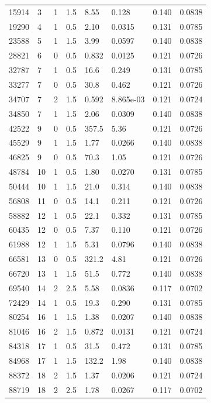 \documentclass[preview]{standalone}
\begin{document}
{{\begin{tabular}{L{1.2cm}C{1.2cm} C{0.3cm}C{0.5cm} C{1.4cm}C{1.4cm} C{1.4cm}C{1.4cm}}
  15914  &     3  & 1     & 1.5 &  8.55  & 0.128  & 0.140 &  0.0838   \\ 
  19290  &     4  & 1     & 0.5 &  2.10  & 0.0315  & 0.131 &  0.0785   \\ 
  23588  &     5  & 1     & 1.5 &  3.99  & 0.0597  & 0.140 &  0.0838   \\ 
  28821  &     6  & 0     & 0.5 &  0.832  & 0.0125  & 0.121 &  0.0726   \\ 
  32787  &     7  & 1     & 0.5 &  16.6  & 0.249  & 0.131 &  0.0785   \\ 
  33277  &     7  & 0     & 0.5 &  30.8  & 0.462  & 0.121 &  0.0726   \\ 
  34707  &     7  & 2     & 1.5 &  0.592  & 8.865e-03  & 0.121 &  0.0724   \\ 
  34850  &     7  & 1     & 1.5 &  2.06  & 0.0309  & 0.140 &  0.0838   \\ 
  42522  &     9  & 0     & 0.5 &  357.5  & 5.36  & 0.121 &  0.0726   \\ 
  45529  &     9  & 1     & 1.5 &  1.77  & 0.0266  & 0.140 &  0.0838   \\ 
  46825  &     9  & 0     & 0.5 &  70.3  & 1.05  & 0.121 &  0.0726   \\ 
  48784  &    10  & 1     & 0.5 &  1.80  & 0.0270  & 0.131 &  0.0785   \\ 
  50444  &    10  & 1     & 1.5 &  21.0  & 0.314  & 0.140 &  0.0838   \\ 
  56808  &    11  & 0     & 0.5 &  14.1  & 0.211  & 0.121 &  0.0726   \\ 
  58882  &    12  & 1     & 0.5 &  22.1  & 0.332  & 0.131 &  0.0785   \\ 
  60435  &    12  & 0     & 0.5 &  7.37  & 0.110  & 0.121 &  0.0726   \\ 
  61988  &    12  & 1     & 1.5 &  5.31  & 0.0796  & 0.140 &  0.0838   \\ 
  66581  &    13  & 0     & 0.5 &  321.2  & 4.81  & 0.121 &  0.0726   \\ 
  66720  &    13  & 1     & 1.5 &  51.5  & 0.772  & 0.140 &  0.0838   \\ 
  69540  &    14  & 2     & 2.5 &  5.58  & 0.0836  & 0.117 &  0.0702   \\ 
  72429  &    14  & 1     & 0.5 &  19.3  & 0.290  & 0.131 &  0.0785   \\ 
  80254  &    16  & 1     & 1.5 &  1.38  & 0.0207  & 0.140 &  0.0838   \\ 
  81046  &    16  & 2     & 1.5 &  0.872  & 0.0131  & 0.121 &  0.0724   \\ 
  84318  &    17  & 1     & 0.5 &  31.5  & 0.472  & 0.131 &  0.0785   \\ 
  84968  &    17  & 1     & 1.5 &  132.2  & 1.98  & 0.140 &  0.0838   \\ 
  88372  &    18  & 2     & 1.5 &  1.37  & 0.0206  & 0.121 &  0.0724   \\ 
  88719  &    18  & 2     & 2.5 &  1.78  & 0.0267  & 0.117 &  0.0702   \\ 
\hline 
\end{tabular} 

}}
\end{document}
